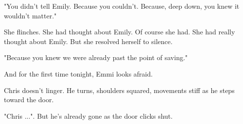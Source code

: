 "You didn’t tell Emily. Because you couldn’t. Because, deep down, you knew it wouldn’t matter."

\smallskip  

She flinches.  She had thought about Emily. Of course she had. She had really thought about Emily. But she resolved herself to silence.

\smallskip  

"Because you knew we were already past the point of saving."  

\smallskip  

And for the first time tonight, Emmi looks afraid.  

\smallskip  

Chris doesn’t linger. He turns, shoulders squared, movements stiff as he steps toward the door.  

\smallskip  

"Chris ...". But he’s already gone as the door clicks shut. 

\newpage


